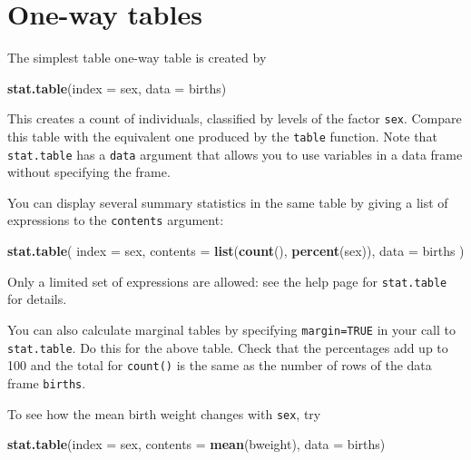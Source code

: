 \documentclass[
]{book}
\newenvironment{Shaded}{\begin{snugshade}}{\end{snugshade}}
\newcommand{\AttributeTok}[1]{\textcolor[rgb]{0.13,0.29,0.53}{#1}}
\newcommand{\FunctionTok}[1]{\textcolor[rgb]{0.13,0.29,0.53}{\textbf{#1}}}
\newcommand{\NormalTok}[1]{#1}
\begin{document}
\section{One-way tables}\label{one-way-tables}

The simplest table one-way table is created by

\begin{Shaded}
\begin{Highlighting}[]
\FunctionTok{stat.table}\NormalTok{(}\AttributeTok{index =}\NormalTok{ sex, }\AttributeTok{data =}\NormalTok{ births)}
\end{Highlighting}
\end{Shaded}

This creates a count of individuals, classified by levels of the
factor \texttt{sex}. Compare this table with the equivalent one produced
by the \texttt{table} function. Note that \texttt{stat.table} has a
\texttt{data} argument that allows you to use variables in a data frame without
specifying the frame.

You can display several summary statistics in the same table by
giving a list of expressions to the \texttt{contents} argument:

\begin{Shaded}
\begin{Highlighting}[]
\FunctionTok{stat.table}\NormalTok{(}
  \AttributeTok{index =}\NormalTok{ sex, }
  \AttributeTok{contents =} \FunctionTok{list}\NormalTok{(}\FunctionTok{count}\NormalTok{(), }\FunctionTok{percent}\NormalTok{(sex)), }
  \AttributeTok{data =}\NormalTok{ births}
\NormalTok{)}
\end{Highlighting}
\end{Shaded}

Only a limited set of expressions are allowed: see the help page
for \texttt{stat.table} for details.

You can also calculate marginal tables by specifying \texttt{margin=TRUE}
in your call to \texttt{stat.table}. Do this for the above table. Check
that the percentages add up to 100 and the total for \texttt{count()} is the
same as the number of rows of the data frame \texttt{births}.

To see how the mean birth weight changes with \texttt{sex}, try

\begin{Shaded}
\begin{Highlighting}[]
\FunctionTok{stat.table}\NormalTok{(}\AttributeTok{index =}\NormalTok{ sex, }\AttributeTok{contents =} \FunctionTok{mean}\NormalTok{(bweight), }\AttributeTok{data =}\NormalTok{ births)}
\end{Highlighting}
\end{Shaded}
\end{document}

